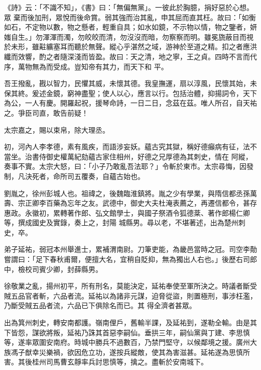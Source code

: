 \begin{pinyinscope}
 《詩》云：「不識不知」，《書》曰：「無偏無黨」。一彼此於胸臆，捐好惡於心想。眾
 棄而後加刑，眾悅而後命賞。弱其強而治其亂，申其屈而直其枉。故曰：「如衡如石，不定物以數，物之懸者，輕重自具；如水如鏡，不示物以情，物之鑒者，妍媸自生。」勿渾渾而濁，勿皎皎而清，勿沒沒而暗，勿察察而明。雖冕旒蔽目而視於未形，雖黈纊塞耳而聽於無聲。縱心乎湛然之域，游神於至道之精。扣之者應洪纖而效響，酌之者隨深淺而皆盈。故曰：天之清，地之寧，王之貞。四時不言而代序，萬物無為而受成。豈知帝有其力，而天下和
 平。



 吾王撥亂，戡以智力，民懼其威，未懷其德。我皇撫運，扇以淳風，民懷其始，未保其終。爰述金鏡，窮神盡聖；使人以心，應言以行。包括治體，抑揚詞令，天下為公，一人有慶。開羅起祝，援琴命詩，一日二日，念茲在茲。唯人所召，自天祐之。爭臣司直，敢告前疑！



 太宗嘉之，賜以束帛，除大理丞。



 初，河內人李孝德，素有風疾，而語涉妄妖。蘊古究其獄，稱好德癲病有征，法不當坐。治書侍御史權萬紀劾蘊古家住相州，好德之兄厚德為其刺史，情在
 阿縱，奏事不實。太宗大怒，曰：「小子乃敢亂吾法耶？」令斬於東市。太宗尋悔，因發制，凡決死者，命所司五覆奏，自蘊古始也。



 劉胤之，徐州彭城人也。祖禕之，後魏臨淮鎮將。胤之少有學業，與隋信都丞孫萬壽、宗正卿李百藥為忘年之友。武德中，御史大夫杜淹表薦之，再遷信都令，甚存惠政。永徽初，累轉著作郎、弘文館學士，與國子祭酒令狐德棻、著作郎楊仁卿等，撰成國史及實錄，奏上之，封陽
 城縣男。尋以老，不堪著述，出為楚州刺史，卒。



 弟子延祐，弱冠本州舉進士，累補渭南尉。刀筆吏能，為畿邑當時之冠。司空李勣嘗謂曰：「足下春秋甫爾，便擅大名，宜稍自貶抑，無為獨出人右也。」後歷右司郎中，檢校司賓少卿，封薛縣男。



 徐敬業之亂，揚州初平，所有刑名，莫能決定，延祐奉使至軍所決之。時議者斷受賊五品官者斬，六品者流。延祐以為諸非元謀，迫脅從盜，則置極刑，事涉枉濫，乃斷受賊五品者流，六品已下俱除名而已。其
 得全濟者甚眾。



 出為箕州刺史，轉安南都護。嶺南俚戶，舊輸半課，及延祐到，遂勒全輸。由是其下皆怨，謀欲將叛，延祐乃誅其首惡李嗣仙。垂拱三年，嗣仙黨與丁建、李思慎等，遂率眾圍安南府。時城中勝兵不過數百，乃禁門堅守，以候鄰境之援。廣州大族馮子猷幸災樂禍，欲因危立功，遂按兵縱敵，使其為害滋甚。延祐遂為思慎所害。其後桂州司馬曹玄靜率兵討思慎等，擒之。盡斬於安南城下。




\end{pinyinscope}
